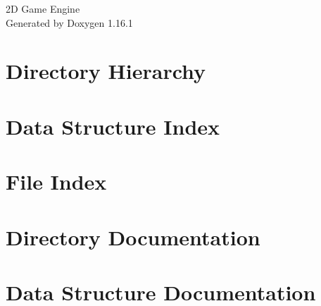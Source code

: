 \documentclass[twoside]{book}
\newcommand{\+}{\discretionary{\mbox{\scriptsize$\hookleftarrow$}}{}{}}
\newcommand{\clearemptydoublepage}{%
    \newpage{\pagestyle{empty}\cleardoublepage}%
  }
\begin{document}
  \raggedbottom
    \hypersetup{pageanchor=false,
                bookmarksnumbered=true,
                pdfencoding=unicode
               }
  \begin{titlepage}
  \vspace*{7cm}
  \begin{center}%
  {\Large 2\+D Game Engine}\\
  \vspace*{1cm}
  {\large Generated by Doxygen 1.16.1}\\
  \end{center}
  \end{titlepage}
  \clearemptydoublepage
  \tableofcontents
  \clearemptydoublepage
  \hypersetup{pageanchor=true}

\chapter{Directory Hierarchy}

\chapter{Data Structure Index}

\chapter{File Index}

\chapter{Directory Documentation}


\chapter{Data Structure Documentation}













\end{document}
